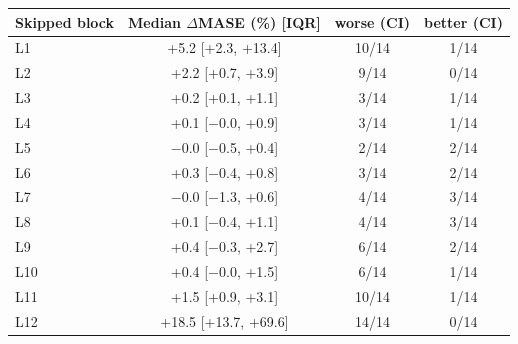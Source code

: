 \begin{tabular}{lccc}
\toprule
Skipped block & Median $\Delta$MASE (\%) [IQR] & worse (CI) & better (CI) \\
\midrule
L1 & +5.2 [+2.3, +13.4] & 10/14 & 1/14 \\
L2 & +2.2 [+0.7, +3.9] & 9/14 & 0/14 \\
L3 & +0.2 [+0.1, +1.1] & 3/14 & 1/14 \\
L4 & +0.1 [$-$0.0, +0.9] & 3/14 & 1/14 \\
L5 & $-$0.0 [$-$0.5, +0.4] & 2/14 & 2/14 \\
L6 & +0.3 [$-$0.4, +0.8] & 3/14 & 2/14 \\
L7 & $-$0.0 [$-$1.3, +0.6] & 4/14 & 3/14 \\
L8 & +0.1 [$-$0.4, +1.1] & 4/14 & 3/14 \\
L9 & +0.4 [$-$0.3, +2.7] & 6/14 & 2/14 \\
L10 & +0.4 [$-$0.0, +1.5] & 6/14 & 1/14 \\
L11 & +1.5 [+0.9, +3.1] & 10/14 & 1/14 \\
L12 & +18.5 [+13.7, +69.6] & 14/14 & 0/14 \\
\bottomrule
\end{tabular}
